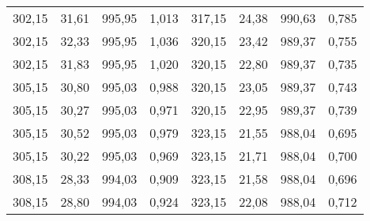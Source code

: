 \begin{table}
\begin{tabular}{c c c c | c c c c}
    302,15 & 31,61 & 995,95 & 1,013 & 317,15 & 24,38 & 990,63 & 0,785 \\
    302,15 & 32,33 & 995,95 & 1,036 & 320,15 & 23,42 & 989,37 & 0,755 \\
    302,15 & 31,83 & 995,95 & 1,020 & 320,15 & 22,80 & 989,37 & 0,735 \\
    305,15 & 30,80 & 995,03 & 0,988 & 320,15 & 23,05 & 989,37 & 0,743 \\
    305,15 & 30,27 & 995,03 & 0,971 & 320,15 & 22,95 & 989,37 & 0,739 \\
    305,15 & 30,52 & 995,03 & 0,979 & 323,15 & 21,55 & 988,04 & 0,695 \\
    305,15 & 30,22 & 995,03 & 0,969 & 323,15 & 21,71 & 988,04 & 0,700 \\
    308,15 & 28,33 & 994,03 & 0,909 & 323,15 & 21,58 & 988,04 & 0,696 \\
    308,15 & 28,80 & 994,03 & 0,924 & 323,15 & 22,08 & 988,04 & 0,712 \\
    \bottomrule
  \end{tabular}
\end{table}